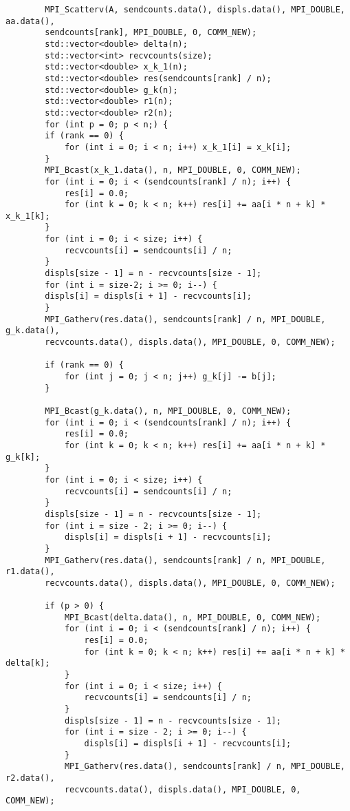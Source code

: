 \documentclass{report}
\begin{document}
\begin{lstlisting}
		MPI_Scatterv(A, sendcounts.data(), displs.data(), MPI_DOUBLE, aa.data(),
		sendcounts[rank], MPI_DOUBLE, 0, COMM_NEW);
		std::vector<double> delta(n);
		std::vector<int> recvcounts(size);
		std::vector<double> x_k_1(n);
		std::vector<double> res(sendcounts[rank] / n);
		std::vector<double> g_k(n);
		std::vector<double> r1(n);
		std::vector<double> r2(n);
		for (int p = 0; p < n;) {
		if (rank == 0) {
			for (int i = 0; i < n; i++) x_k_1[i] = x_k[i];
		}
		MPI_Bcast(x_k_1.data(), n, MPI_DOUBLE, 0, COMM_NEW);
		for (int i = 0; i < (sendcounts[rank] / n); i++) {
			res[i] = 0.0;
			for (int k = 0; k < n; k++) res[i] += aa[i * n + k] * x_k_1[k];
		}
		for (int i = 0; i < size; i++) {
			recvcounts[i] = sendcounts[i] / n;
		}
		displs[size - 1] = n - recvcounts[size - 1];
		for (int i = size-2; i >= 0; i--) {
		displs[i] = displs[i + 1] - recvcounts[i];
		}
		MPI_Gatherv(res.data(), sendcounts[rank] / n, MPI_DOUBLE, g_k.data(),
		recvcounts.data(), displs.data(), MPI_DOUBLE, 0, COMM_NEW);
		
		if (rank == 0) {
			for (int j = 0; j < n; j++) g_k[j] -= b[j];
		}
		
		MPI_Bcast(g_k.data(), n, MPI_DOUBLE, 0, COMM_NEW);
		for (int i = 0; i < (sendcounts[rank] / n); i++) {
			res[i] = 0.0;
			for (int k = 0; k < n; k++) res[i] += aa[i * n + k] * g_k[k];
		}
		for (int i = 0; i < size; i++) {
			recvcounts[i] = sendcounts[i] / n;
		}
		displs[size - 1] = n - recvcounts[size - 1];
		for (int i = size - 2; i >= 0; i--) {
			displs[i] = displs[i + 1] - recvcounts[i];
		}
		MPI_Gatherv(res.data(), sendcounts[rank] / n, MPI_DOUBLE, r1.data(),
		recvcounts.data(), displs.data(), MPI_DOUBLE, 0, COMM_NEW);
		
		if (p > 0) {
			MPI_Bcast(delta.data(), n, MPI_DOUBLE, 0, COMM_NEW);
			for (int i = 0; i < (sendcounts[rank] / n); i++) {
				res[i] = 0.0;
				for (int k = 0; k < n; k++) res[i] += aa[i * n + k] * delta[k];
			}
			for (int i = 0; i < size; i++) {
				recvcounts[i] = sendcounts[i] / n;
			}
			displs[size - 1] = n - recvcounts[size - 1];
			for (int i = size - 2; i >= 0; i--) {
				displs[i] = displs[i + 1] - recvcounts[i];
			}
			MPI_Gatherv(res.data(), sendcounts[rank] / n, MPI_DOUBLE, r2.data(),
			recvcounts.data(), displs.data(), MPI_DOUBLE, 0, COMM_NEW);
			

\end{lstlisting}
\end{document}
